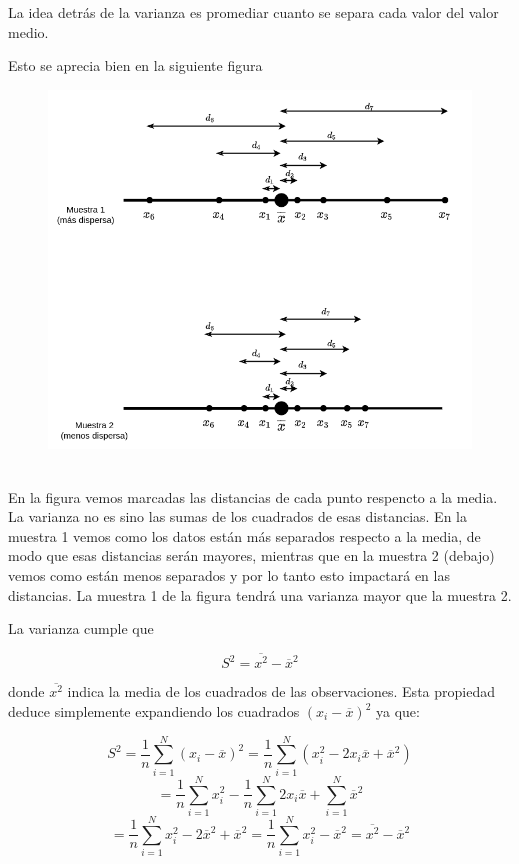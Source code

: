 \documentclass[
]{article}
\begin{document}
La idea detrás de la varianza es promediar cuanto se separa cada valor
del valor medio.

Esto se aprecia bien en la siguiente figura

\begin{figure}
\centering
\includegraphics[width=5.72917in,height=\textheight]{img/desviaciones_diagrama.drawio.png}
\caption{~}
\end{figure}

En la figura vemos marcadas las distancias de cada punto respencto a la
media. La varianza no es sino las sumas de los cuadrados de esas
distancias. En la muestra 1 vemos como los datos están más separados
respecto a la media, de modo que esas distancias serán mayores, mientras
que en la muestra 2 (debajo) vemos como están menos separados y por lo
tanto esto impactará en las distancias. La muestra 1 de la figura tendrá
una varianza mayor que la muestra 2.

La varianza cumple que

\[S^2 = \overline{x^2} - \overline x^2\]

donde \(\overline{x^2}\) indica la media de los cuadrados de las
observaciones. Esta propiedad deduce simplemente expandiendo los
cuadrados \((x_i - \overline x)^2\) ya que:

\[S^2 = \frac{1}{n}\sum^N_{i=1} (x_i - \overline x)^2 = \frac{1}{n}\sum^N_{i=1} (x^2_i - 2x_i \overline x + \overline x^2)\]
\[=\frac{1}{n}\sum^N_{i=1} x_i^2 - \frac{1}{n}\sum^N_{i=1}2 x_i \overline x + \sum^N_{i=1}\overline x^2\]
\[=\frac{1}{n}\sum^N_{i=1} x_i^2 - 2 \overline x^2 + \overline x^2 = \frac{1}{n}\sum^N_{i=1} x_i^2 - \overline x^2 = \overline{x^2} - \overline x^2\]
\end{document}
